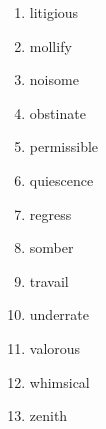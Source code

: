 \begin{enumerate}
\item litigious \underline{\hspace{2in}}

\item mollify \underline{\hspace{2in}}

\item noisome \underline{\hspace{2in}}

\item obstinate \underline{\hspace{2in}}

\item permissible  \underline{\hspace{2in}}

\item quiescence  \underline{\hspace{2in}}

\item regress  \underline{\hspace{2in}}

\item somber  \underline{\hspace{2in}}

\item travail  \underline{\hspace{2in}}

\item underrate  \underline{\hspace{2in}}

\item valorous  \underline{\hspace{2in}}

\item whimsical  \underline{\hspace{2in}}

\item zenith  \underline{\hspace{2in}}

\end{enumerate} 





